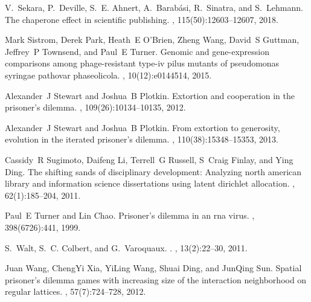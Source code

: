 \documentclass{article}
\theoremstyle{definition}
\begin{document}
\begin{thebibliography}{10}
    V.~Sekara, P.~Deville, S.~E. Ahnert, A.~Barab{\'a}si, R.~Sinatra, and
      S.~Lehmann.
    \newblock The chaperone effect in scientific publishing.
    ,
      115(50):12603--12607, 2018.
    
    Mark Sistrom, Derek Park, Heath~E O’Brien, Zheng Wang, David~S Guttman,
      Jeffrey~P Townsend, and Paul~E Turner.
    \newblock Genomic and gene-expression comparisons among phage-resistant type-iv
      pilus mutants of pseudomonas syringae pathovar phaseolicola.
    , 10(12):e0144514, 2015.
    
    Alexander~J Stewart and Joshua~B Plotkin.
    \newblock Extortion and cooperation in the prisoner’s dilemma.
    ,
      109(26):10134--10135, 2012.
    
    Alexander~J Stewart and Joshua~B Plotkin.
    \newblock From extortion to generosity, evolution in the iterated prisoner’s
      dilemma.
    ,
      110(38):15348--15353, 2013.
    
    Cassidy~R Sugimoto, Daifeng Li, Terrell~G Russell, S~Craig Finlay, and Ying
      Ding.
    \newblock The shifting sands of disciplinary development: Analyzing north
      american library and information science dissertations using latent dirichlet
      allocation.
    , 62(1):185--204, 2011.
    
    Paul~E Turner and Lin Chao.
    \newblock Prisoner's dilemma in an rna virus.
    , 398(6726):441, 1999.
    
    S.~Walt, S.~C. Colbert, and G.~Varoquaux.
    .
    , 13(2):22--30, 2011.
    
    Juan Wang, ChengYi Xia, YiLing Wang, Shuai Ding, and JunQing Sun.
    \newblock Spatial prisoner’s dilemma games with increasing size of the
      interaction neighborhood on regular lattices.
    , 57(7):724--728, 2012.
    

\end{thebibliography}
\end{document}

